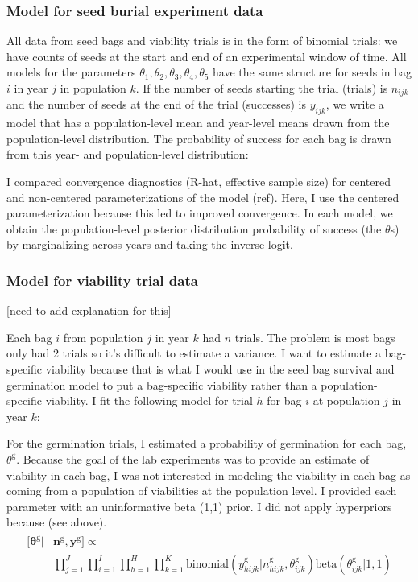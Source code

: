\documentclass[12pt, oneside, titlepage]{article}   	%
\begin{document}
\subsubsection*{Model for seed burial experiment data}

All data from seed bags and viability trials is in the form of binomial trials: we have counts of seeds at the start and end of an experimental window of time. All models for the parameters $\theta_1, \theta_2, \theta_3, \theta_4, \theta_5$ have the same structure for seeds in bag $i$ in year $j$ in population $k$. If the number of seeds starting the trial (trials) is $n_{ijk}$ and the number of seeds at the end of the trial (successes) is $y_{ijk}$, we write a model that has a population-level mean and year-level means drawn from the population-level distribution. The probability of success for each bag is drawn from this year- and population-level distribution:

I compared convergence diagnostics (R-hat, effective sample size) for centered and non-centered parameterizations of the model (ref). Here, I use the centered parameterization because this led to improved convergence. In each model, we obtain the population-level posterior distribution probability of success (the $\theta$s) by marginalizing across years and taking the inverse logit.

\subsubsection*{Model for viability trial data}

[need to add explanation for this]

\iffalse
Each bag $i$ from population $j$ in year $k$ had $n$ trials. The problem is most bags only had 2 trials so it's difficult to estimate a variance. I want to estimate a bag-specific viability because that is what I would use in the seed bag survival and germination model to put a bag-specific viability rather than a population-specific viability. I fit the following model for trial $h$ for bag $i$ at population $j$ in year $k$:

For the germination trials, I estimated a probability of germination for each bag, $\theta^\mathrm{g}$. Because the goal of the lab experiments was to provide an estimate of viability in each bag, I was not interested in modeling the viability in each bag as coming from a population of viabilities at the population level. I provided each parameter with an uninformative beta (1,1) prior. I did not apply hyperpriors because (see above).
%
\begin{align}
  \begin{split}
 [\bm{\theta^{\mathrm{g}}} | & \bm{n^{\mathrm{g}}}, \bm{y^{\mathrm{g}}} ] \propto
 \\  & \prod_{j=1}^{J} \prod_{i=1}^{I}  \prod_{h=1}^{H} \prod_{k=1}^{K}  \mathrm{binomial} ( y^{\mathrm{g}}_{hijk} | n^{\mathrm{g}}_{hijk}, \theta^{\mathrm{g}}_{ijk} )
\mathrm{beta} (  \theta^{\mathrm{g}}_{ijk} | 1 , 1 )
  \end{split}
\end{align}
\end{document}
